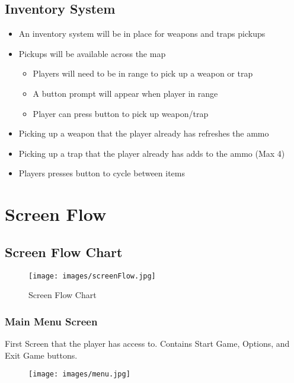\documentclass[11pt]{report}
\begin{document}
\subsection{Inventory System}

\begin{itemize}
    \item An inventory system will be in place for weapons and traps pickups
    \item Pickups will be available across the map 
    \begin{itemize}
        \item Players will need to be in range to pick up a weapon or trap
        \item A button prompt will appear when player in range
        \item Player can press button to pick up weapon/trap
    \end{itemize}
    \item Picking up a weapon that the player already has refreshes the ammo
    \item Picking up a trap that the player already has adds to the ammo (Max 4)
    \item Players presses button to cycle between items    
\end{itemize}

\section{Screen Flow}
\subsection{Screen Flow Chart}

\begin{figure}[H]
    \centering
    \texttt{[image: images/screenFlow.jpg]}
    \caption{Screen Flow Chart}
\end{figure}

\subsubsection{Main Menu Screen}

First Screen that the player has access to. Contains Start Game, Options, and Exit Game buttons.

\begin{figure}[H]
    \centering
    \texttt{[image: images/menu.jpg]}
    \caption{}
\end{figure}
\end{document}

